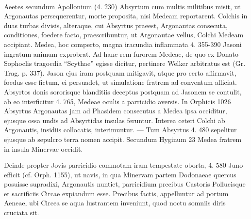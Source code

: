 \documentclass[landscape, a4paper, 11pt, oneside, polutonikogreek, german]{article}
\begin{document}
\paragraph{}
Aeetes secundum Apollonium (4. 230) Absyrtum cum multis militibus misit, ut Argonautas persequerentur, morte proposita, nisi Medeam reportarent. Colchis in duas turbas divisis, alteraque, cui Absyrtus praeest, Argonautas consecuta, conditiones, foedere facto, praescribuntur, ut Argonautae vellus, Colchi Medeam accipiant. Medea, hoc comperto, magna iracundia inflammata 4. 355-390 Jasoni ingratum animum exprobrat. Ad hanc rem furorem Medeae, de quo ex Donato Sophoclis tragoedia "`Scythae"' egisse dicitur, pertinere Welker arbitratus est (Gr. Trag. p. 337). Jason ejus iram postquam mitigavit, atque pro certo affirmavit, foedus esse fictum, ei persuadet, ut simulatione fratrem ad conventum alliciat. Absyrtos donis sororisque blanditiis deceptus postquam ad Jasonem se contulit, ab eo interficitur 4. 765, Medeae oculis a parricidio aversis. In Orphicis 1026 Absyrtus Argonautas jam ad Phasidem consecutus a Medea ipsa occiditur, ejusque ossa undis ad Absyrtidas insulas feruntur. Interea ceteri Colchi ab Argonautis, insidiis collocatis, interimuntur. --- Tum Absyrtus 4. 480 sepelitur ejusque ab sepulcro terra nomen accipit. Secundum Hyginum 23 Medea fratrem in insula Minervae occidit.

Deinde propter Jovis parricidio commotam iram tempestate oborta, 4. 580 Juno efficit (cf. Orph. 1155), ut navis, in qua Minervam partem Dodonaeae quercus posuisse supradixi, Argonautis nuntiet, parricidium precibus Castoris Pollucisque et sacrificiis Circae expiandum esse. Precibus factis, appelluntur ad portum Aeneae, ubi Circea se aqua lustrantem inveniunt, quod noctu somniis diris cruciata sit.
\end{document}
